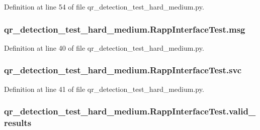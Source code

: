 Definition at line 54 of file qr\-\_\-detection\-\_\-test\-\_\-hard\-\_\-medium.\-py.

\hypertarget{classqr__detection__test__hard__medium_1_1RappInterfaceTest_ae1191fa1926efcb076a506f497fb1a24}{
\subsubsection[{msg}]{\setlength{\rightskip}{0pt plus 5cm}qr\-\_\-detection\-\_\-test\-\_\-hard\-\_\-medium.\-Rapp\-Interface\-Test.\-msg}}\label{classqr__detection__test__hard__medium_1_1RappInterfaceTest_ae1191fa1926efcb076a506f497fb1a24}


Definition at line 40 of file qr\-\_\-detection\-\_\-test\-\_\-hard\-\_\-medium.\-py.

\hypertarget{classqr__detection__test__hard__medium_1_1RappInterfaceTest_a1036f7ccf5017795217e49f065a1920e}{
\subsubsection[{svc}]{\setlength{\rightskip}{0pt plus 5cm}qr\-\_\-detection\-\_\-test\-\_\-hard\-\_\-medium.\-Rapp\-Interface\-Test.\-svc}}\label{classqr__detection__test__hard__medium_1_1RappInterfaceTest_a1036f7ccf5017795217e49f065a1920e}


Definition at line 41 of file qr\-\_\-detection\-\_\-test\-\_\-hard\-\_\-medium.\-py.

\hypertarget{classqr__detection__test__hard__medium_1_1RappInterfaceTest_a6387be354239f9a786ad7c404272d7a0}{
\subsubsection[{valid\-\_\-results}]{\setlength{\rightskip}{0pt plus 5cm}qr\-\_\-detection\-\_\-test\-\_\-hard\-\_\-medium.\-Rapp\-Interface\-Test.\-valid\-\_\-results}}\label{classqr__detection__test__hard__medium_1_1RappInterfaceTest_a6387be354239f9a786ad7c404272d7a0}


